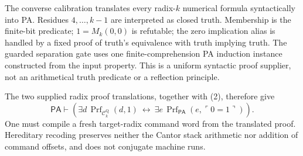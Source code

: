 \documentclass[11pt]{article}
\newcommand{\PA}{\mathsf{PA}}
\newcommand{\C}{\mathcal C}
\begin{document}
The converse calibration translates every radix-$k$ numerical formula
syntactically into PA. Residues $4,\ldots,k-1$ are interpreted as closed
truth. Membership is the finite-bit predicate; $1=M_k(0,0)$ is refutable;
the zero implication alias is handled by a fixed proof of truth's
equivalence with truth implying truth. The guarded separation gate uses
one finite-comprehension PA induction instance constructed from the input
property. This is a uniform syntactic proof supplier, not an arithmetical
truth predicate or a reflection principle.

The two supplied radix proof translations, together with (2), therefore
give
\[
 \PA\vdash
 \left(\exists d\,\operatorname{Prf}_{\C_k^{\mathrm Q}}(d,1)
 \ \leftrightarrow\
 \exists e\,\operatorname{Prf}_{\PA}(e,\ulcorner0=1\urcorner)\right).
                                                               \tag{3}
\]
One must compile a fresh target-radix command word from the translated
proof. Hereditary recoding preserves neither the Cantor stack arithmetic
nor addition of command offsets, and does not conjugate machine runs.
\end{document}
